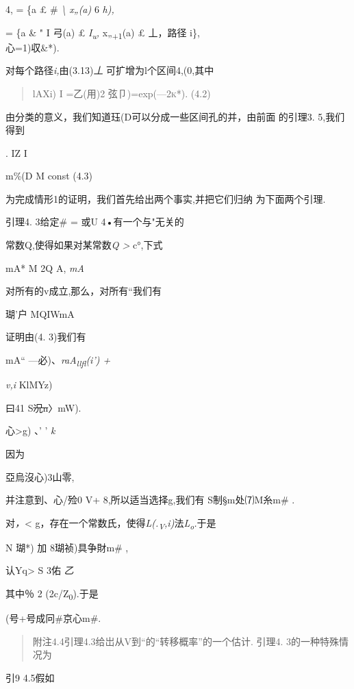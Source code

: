 \documentclass{article}
\begin{document}
4, = \{a £ \# \emph{\textbackslash{} x„(a)} 6 \emph{h),}

= \{a \& " I 弓(a) £ \emph{I\textsubscript{u},} x„\textsubscript{+1}(a)
£ 丄，路径 i\},\\
心=1)収\&*).

对每个路径\emph{i,}由(3.13)\emph{丄} 可扩增为l个区间4,(0,其中

\begin{quote}
lAXi) I =乙(用)2 弦卩)=exp(---\textsc{2k*).} (4.2)
\end{quote}

由分类的意义，我们知道珏(D可以分成一些区间孔的并，由前面 的引理3.
5,我们得到

. IZ I

m\%(D M const (4.3)

为完成情形1的证明，我们首先给出两个事实,并把它们归纳 为下面两个引理.

引理4. 3给定\# = 或U 4•有一个与"无关的

常数Q,使得如果对某常数\emph{Q \textgreater{}} c°,下式

mA* M 2Q \textbar{} A, \textbar{} \emph{mA}

对所有的v成立,那么，对所有``我们有

瑚'户 MQIWmA

证明由(4. 3)我们有

mA`` ---必)、\emph{raA\textsubscript{llfl}(i') +}

\emph{v,i} KlMYz)

曰41 S\sout{况n}〉mW).

心\textgreater{}g) 、' ' \emph{k}

因为

亞烏沒心)3山零,

并注意到、心\textbar{}/殓0 V+ 8,所以适当选择g,我们有 S制§m处⑺M糸m\# .

对\emph{，}\textless{}
g，存在一个常数氏，使得\emph{L(.\textsubscript{V},i)}法\emph{L\textsubscript{o}.}于是

N 瑚*) 加 8瑚祯)具争財m\# ,

认Yq\textgreater{} S 3佑 \emph{乙}

其中％ 2 (2c/Z\textsubscript{0}).于是

(号+号\textbar{}成冋\#京心\textbar{}m\#. \textbar{}

\begin{quote}
附注4.4引理4.3给岀从V到``的``转移概率''的一个估计. 引理4.
3的一种特殊情况为
\end{quote}

引9 4.5假如
\end{document}
